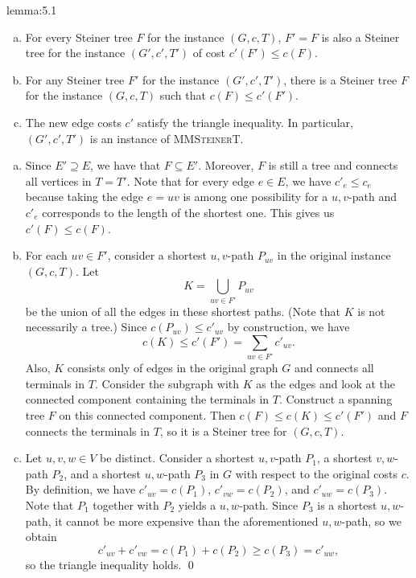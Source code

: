 \begin{lemma}{lemma:5.1}
    \begin{enumerate}[(a)]
        \item For every Steiner tree $F$ for the instance 
        $(G, c, T)$, $F' = F$ is also a Steiner tree for the 
        instance $(G', c', T')$ of cost 
        $c'(F') \leq c(F)$. 
        \item For any Steiner tree $F'$ for the instance 
        $(G', c', T')$, there is a Steiner tree $F$ for the 
        instance $(G, c, T)$ such that $c(F) \leq c'(F')$. 
        \item The new edge costs $c'$ satisfy the triangle inequality. In particular, 
        $(G', c', T')$ is an instance of \textsc{MMSteinerT}.
    \end{enumerate}
\end{lemma}\vspace{-0.25cm}
\begin{pf}
    \begin{enumerate}[(a)]
        \item Since $E' \supseteq E$, we have that $F \subseteq E'$. Moreover, 
        $F$ is still a tree and connects all vertices in $T = T'$. Note that 
        for every edge $e \in E$, we have $c'_e \leq c_e$ because 
        taking the edge $e = uv$ is among one possibility for a $u,v$-path
        and $c'_e$ corresponds to the length of the shortest one. This 
        gives us $c'(F) \leq c(F)$. 
        \item For each $uv \in F'$, consider a shortest $u, v$-path 
        $P_{uv}$ in the original instance $(G, c, T)$. Let 
        \[ K = \bigcup_{uv \in F'} P_{uv} \] 
        be the union of all the edges in these shortest paths. (Note that 
        $K$ is not necessarily a tree.) Since $c(P_{uv}) \leq c'_{uv}$ 
        by construction, we have 
        \[ c(K) \leq c'(F') = \sum_{uv \in F'} c'_{uv}. \]
        Also, $K$ consists only of edges in the original graph $G$ and 
        connects all terminals in $T$. Consider the subgraph  
        with $K$ as the edges and look at the connected component containing 
        the terminals in $T$. Construct a spanning tree $F$ on this connected 
        component. Then $c(F) \leq c(K) \leq c'(F')$ and $F$ connects 
        the terminals in $T$, so it is a Steiner tree for $(G, c, T)$. 
        \item Let $u, v, w \in V$ be distinct. Consider a shortest $u,v$-path 
        $P_1$, a shortest $v,w$-path $P_2$, and a shortest $u,w$-path $P_3$ 
        in $G$ with respect to the original costs $c$. By definition, we have 
        $c'_{uv} = c(P_1)$, $c'_{vw} = c(P_2)$, and $c'_{uw} = c(P_3)$. 
        Note that $P_1$ together with $P_2$ yields a $u,w$-path. Since $P_3$ 
        is a shortest $u,w$-path, it cannot be more expensive than 
        the aforementioned $u,w$-path, so we obtain 
        \[ c'_{uv} + c'_{vw} = c(P_1) + c(P_2) \geq c(P_3) = c'_{uw}, \] 
        so the triangle inequality holds. \qed
    \end{enumerate} 
\end{pf}\vspace{-0.25cm}

